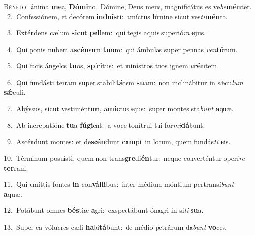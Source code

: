 \lettrine{\initial\textcolor{\initialcolor}{B}}{énedic} ánima \textbf{me}\-a, \textbf{Dó}\-\textbf{mi}no:~\star Dómine, Deus meus, magnificátus es ve\-\textit{he}\-\textbf{mén}ter.\\
{\numbfont\textcolor{\numbcolor}{~2.}}~Confessiónem, et decórem \textbf{ind}\-u\-\textbf{ís}\-ti:~\star amíctus lúmine sicut ves\-\textit{ti}\-\textbf{mén}to.\par
{\numbfont\textcolor{\numbcolor}{~3.}}~Exténdens cælum \textbf{sic}\-ut \textbf{pel}\-lem:~\star qui tegis aquis superió\textit{ra} \textbf{e}\-jus.\par
{\numbfont\textcolor{\numbcolor}{~4.}}~Qui ponis nubem a\-\textbf{scén}\-sum \textbf{tu}\-um:~\star qui ámbulas super pennas \textit{ven}\-\textbf{tó}rum.\par
{\numbfont\textcolor{\numbcolor}{~5.}}~Qui facis ángelos \textbf{tu}\-os, \textbf{spí}\-\textbf{ri}tus:~\star et minístros tuos ignem \textit{u}\-\textbf{rén}tem.\par
{\numbfont\textcolor{\numbcolor}{~6.}}~Qui fundásti terram super stabili\-\textbf{tá}\-tem \textbf{su}\-am:~\star non inclinábitur in sǽcu\textit{lum} \textbf{sǽ}\-culi.\par
{\numbfont\textcolor{\numbcolor}{~7.}}~Abýssus, sicut vestiméntum, a\-\textbf{míc}\-tus \textbf{e}\-jus:~\star super montes sta\textit{bunt} \textbf{a}\-quæ.\par
{\numbfont\textcolor{\numbcolor}{~8.}}~Ab increpatióne \textbf{tu}\-a \textbf{fú}\-\textbf{gi}ent:~\star a voce tonítrui tui for\-\textit{mi}\-\textbf{dá}bunt.\par
{\numbfont\textcolor{\numbcolor}{~9.}}~Ascéndunt montes: et de\-\textbf{scén}\-dunt \textbf{cam}\-pi~\star in locum, quem fundás\textit{ti} \textbf{e}\-is.\par
{\numbfont\textcolor{\numbcolor}{10.}}~Términum posuísti, quem non trans\-\textbf{gre}\-di\-\textbf{én}\-tur:~\star neque converténtur operí\textit{re} \textbf{ter}\-ram.\par
{\numbfont\textcolor{\numbcolor}{11.}}~Qui emíttis fontes \textbf{in} con\-\textbf{vál}\-\textbf{li}bus:~\star inter médium móntium pertransí\textit{bunt} \textbf{a}\-quæ.\par
{\numbfont\textcolor{\numbcolor}{12.}}~Potábunt omnes \textbf{bés}\-tiæ \textbf{a}\-gri:~\star exspectábunt ónagri in si\textit{ti} \textbf{su}\-a.\par
{\numbfont\textcolor{\numbcolor}{13.}}~Super ea vólucres cæli \textbf{ha}\-bi\-\textbf{tá}\-bunt:~\star de médio petrárum da\textit{bunt} \textbf{vo}\-ces.\par
